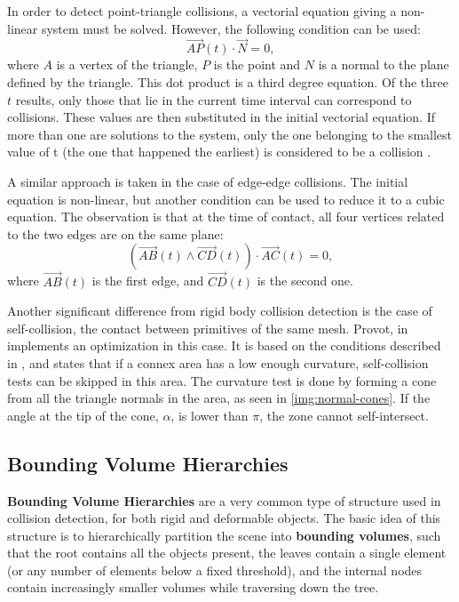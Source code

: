 In order to detect point-triangle collisions, a vectorial equation giving a non-linear system must be solved. However, the following condition can be used: \[\overrightarrow{AP}(t) \cdot \overrightarrow{N} = 0,\] where $A$ is a vertex of the triangle, $P$ is the point and $N$ is a normal to the plane defined by the triangle. This dot product is a third degree equation. Of the three $t$ results, only those that lie in the current time interval can correspond to collisions. These values are then substituted in the initial vectorial equation. If more than one are solutions to the system, only the one belonging to the smallest value of t (the one that happened the earliest) is considered to be a collision \citep{provot97}.

A similar approach is taken in the case of edge-edge collisions. The initial equation is non-linear, but another condition can be used to reduce it to a cubic equation. The observation is that at the time of contact, all four vertices related to the two edges are on the same plane: \[(\overrightarrow{AB}(t) \wedge \overrightarrow{CD}(t)) \cdot \overrightarrow{AC}(t) = 0,\] where $\overrightarrow{AB}(t)$ is the first edge, and $\overrightarrow{CD}(t)$ is the second one.


\label{lab:ncones}
Another significant difference from rigid body collision detection is the case of self-collision, the contact between primitives of the same mesh. Provot, in \citep{provot97} implements an optimization in this case. It is based on the conditions described in \citep{vmt94}, and states that if a connex area has a low enough curvature, self-collision tests can be skipped in this area. The curvature test is done by forming a cone from all the triangle normals in the area, as seen in \autoref{img:normal-cones}. If the angle at the tip of the cone, $\alpha$, is lower than $\pi$, the zone cannot self-intersect.

\subsection{Bounding Volume Hierarchies}
\label{sub-sec:bvh}

\textbf{Bounding Volume Hierarchies} are a very common type of structure used in collision detection, for both rigid and deformable objects. The basic idea of this structure is to hierarchically partition the scene into \textbf{bounding volumes}, such that the root contains all the objects present, the leaves contain a single element (or any number of elements below a fixed threshold), and the internal nodes contain increasingly smaller volumes while traversing down the tree.

